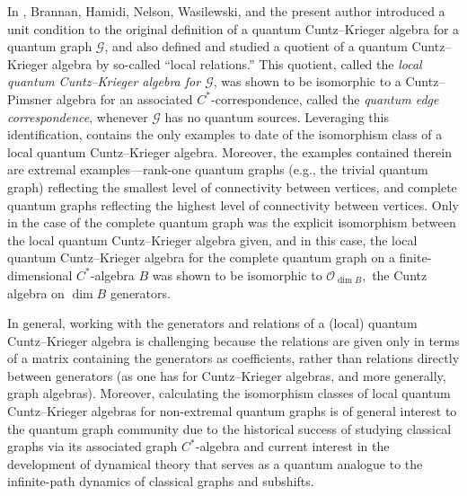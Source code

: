 \documentclass[11pt]{article}
\theoremstyle{plain}
\theoremstyle{nonumberplain}
\theoremstyle{plain}
\theoremstyle{nonumberplain}
\newcommand\1{{\bf 1}}
\newcommand\cG{{\mathcal G}}
\newcommand\cO{{\mathcal O}}
\newcommand{\<}{\left\langle}
\renewcommand{\>}{\right\rangle}
\begin{document}
In \cite{BHINW23}, Brannan, Hamidi, Nelson, Wasilewski, and the present author introduced a unit condition to the original definition of a quantum Cuntz--Krieger algebra for a quantum graph $\cG$, and also defined and studied a quotient of a quantum Cuntz--Krieger algebra by so-called ``local relations.'' This quotient, called the {\em local quantum Cuntz--Krieger algebra for $\cG$}, was shown to be isomorphic to a Cuntz--Pimsner algebra for an associated $C^*$-correspondence, called the {\em quantum edge correspondence}, whenever $\cG$ has no quantum sources. Leveraging this identification, \cite[Section 4]{BHINW23} contains the only examples to date of the isomorphism class of a local quantum Cuntz--Krieger algebra. Moreover, the examples contained therein are extremal examples---rank-one quantum graphs (e.g., the trivial quantum graph) reflecting the smallest level of connectivity between vertices, and complete quantum graphs reflecting the highest level of connectivity between vertices. Only in the case of the complete quantum graph was the explicit isomorphism between the local quantum Cuntz--Krieger algebra given, and in this case, the local quantum Cuntz--Krieger algebra for the complete quantum graph on a finite-dimensional $C^*$-algebra $B$ was shown to be isomorphic to $\cO_{\dim B},$ the Cuntz algebra on $\dim B$ generators.

In general, working with the generators and relations of a (local) quantum Cuntz--Krieger algebra is challenging because the relations are given only in terms of a matrix containing the generators as coefficients, rather than relations directly between generators (as one has for Cuntz--Krieger algebras, and more generally, graph algebras). Moreover, calculating the isomorphism classes of local quantum Cuntz--Krieger algebras for non-extremal quantum graphs is of general interest to the quantum graph community due to the historical success of studying classical graphs via its associated graph $C^*$-algebra and current interest in the development of dynamical theory that serves as a quantum analogue to the infinite-path dynamics of classical graphs and subshifts. %
\end{document}
